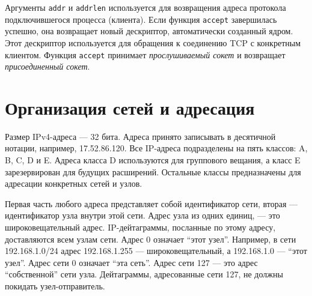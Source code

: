 Аргументы \lstinline{addr} и \lstinline{addrlen} используется для возвращения адреса протокола подключившегося процесса (клиента). Если функция \lstinline{accept} завершилась успешно, она возвращает новый дескриптор, автоматически созданный ядром. Этот дескриптор используется для обращения к соединению TCP с конкретным клиентом. Функция \lstinline{accept} принимает \emph{прослушиваемый сокет} и возвращает \emph{присоединенный сокет}.

\section{Организация сетей и адресация}
\label{sec:network-setup}

Размер IPv4-адреса --- 32 бита. Адреса принято записывать в десятичной нотации, например, 17.52.86.120. Все IP-адреса подразделены на пять классов: A, B, C, D и E. Адреса класса D используются для группового вещания, а класс E зарезервирован для будущих расширений. Остальные классы предназначены для адресации конкретных сетей и узлов.

Первая часть любого адреса представляет собой идентификатор сети, вторая --- идентификатор узла внутри этой сети. Адрес узла из одних единиц, --- это широковещательный адрес. IP-дейтаграммы, посланные по этому адресу, доставляются всем узлам сети. Адрес 0 означает ``этот узел''. Например, в сети 192.168.1.0/24 адрес 192.168.1.255 --- широковещательный, а 192.168.1.0 --- ``этот узел''. Адрес сети 0 означает ``эта сеть''. Адрес сети 127 --- это адрес ``собственной'' сети узла. Дейтаграммы, адресованные сети 127, не должны покидать узел-отправитель.

